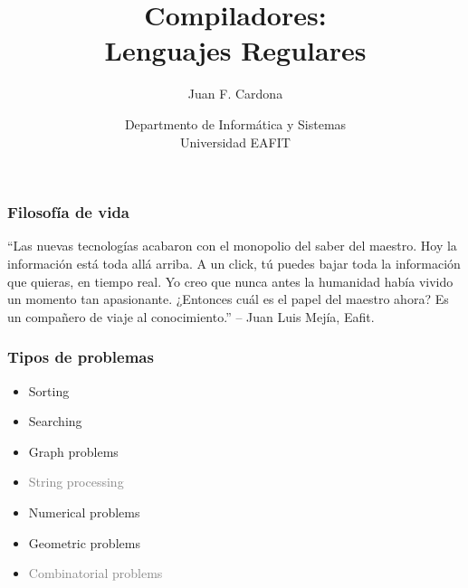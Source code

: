 \documentclass[a4,12pt]{beamer}
\title{Compiladores: \\ Lenguajes Regulares}
\author{Juan F. Cardona}
\date{Departmento de Informática y Sistemas\\ Universidad EAFIT}
\newcommand{\blue}[1] {\textcolor{mrblue}{#1}}
\newcommand{\red}[1] {\textcolor{gray}{#1}}
\begin{document}
\frame{\titlepage}



\begin{frame}
\frametitle{Filosofía de vida}

\blue{``Las nuevas tecnologías acabaron con el monopolio del saber del maestro. Hoy la información
está toda allá arriba. A un click, tú puedes bajar toda la información que quieras, en tiempo real. Yo
creo que nunca antes la humanidad había vivido un momento tan apasionante. ¿Entonces cuál
es el papel del maestro ahora? Es un compañero de viaje al conocimiento.''} -- Juan Luis Mejía, Eafit.

\end{frame}


\begin{frame}
\frametitle{Tipos de problemas}
\begin{itemize}
\item \blue{Sorting}

\item \blue{Searching}

\item \blue{Graph problems}

\item \red{String processing}

\item Numerical problems

\item Geometric problems

\item \red{Combinatorial problems}

\end{itemize}

\end{frame}
\end{document}
